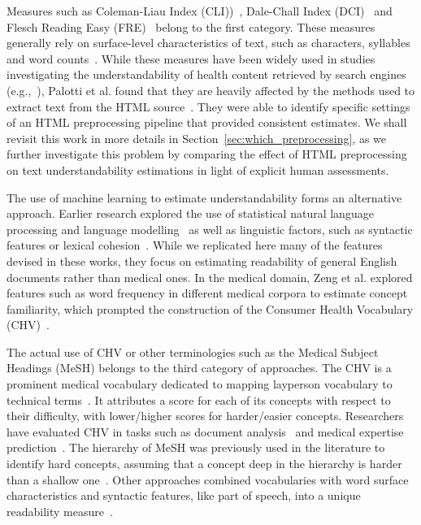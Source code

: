 Measures such as Coleman-Liau Index (CLI))~\cite{cli75}, Dale-Chall Index (DCI)~\cite{dale48} and Flesch Reading Easy (FRE)~\cite{flesch75}
belong to the first category. These measures generally rely on surface-level characteristics of text, such as characters, syllables and word counts~\cite{dubay04}. While these measures have been widely used in studies investigating the understandability of health content retrieved by search engines (e.g.,~\cite{becker04,graber99,fitzsimmons10,stossel12,wiener13,patel13,atcherson14,meillier17}), Palotti et al. found that they are heavily affected by the methods used to extract text from the HTML source~\cite{palotti15}. They were able to identify specific settings of an HTML preprocessing pipeline that provided consistent estimates. We shall revisit this work in more details in Section~\ref{sec:which_preprocessing}, as we further investigate this problem by comparing the effect of HTML preprocessing on text understandability estimations in light of explicit human assessments. 

The use of machine learning to estimate understandability forms an alternative approach. Earlier research explored the use of statistical natural language processing and language modelling~\cite{liu04,collins05,heilman07} as well as linguistic factors, such as syntactic features or lexical cohesion~\cite{pitler08}. While we replicated here many of the features devised in these works, they focus on estimating readability of general English documents rather than medical ones. In the medical domain, Zeng et al. explored features such as word frequency in different medical corpora to estimate concept familiarity, which prompted the construction of the Consumer Health Vocabulary (CHV)~\cite{zeng05,zeng06,zeng08}.  

The actual use of CHV or other terminologies such as the Medical Subject Headings (MeSH) belongs to the third category of approaches. The CHV is a prominent medical vocabulary dedicated to mapping layperson vocabulary to technical terms~\cite{zeng06}. It attributes a score for each of its concepts with respect to their difficulty, with lower/higher scores for harder/easier concepts. Researchers have evaluated CHV in tasks such as document analysis~\cite{leroy08} and medical expertise prediction~\cite{palotti14}.
The hierarchy of MeSH was previously used in the literature to identify hard concepts, assuming that a concept deep in the hierarchy is harder than a shallow one~\cite{yan11}. Other approaches combined vocabularies with word surface characteristics and syntactic features, like part of speech, into a unique readability measure~\cite{kim2007beyond}.

